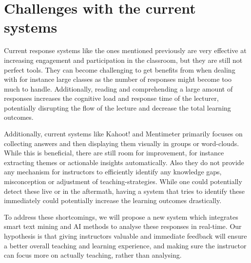 \section{Challenges with the current systems}


Current response systems like the ones mentioned previously are very effective at increasing engagement and participation in the classroom, but they are still not perfect tools. They can become challenging to get benefits from when dealing with for instance large classes as the number of responses might become too much to handle. Additionally, reading and comprehending a large amount of responses increases the cognitive load and response time of the lecturer, potentially disrupting the flow of the lecture and decrease the total learning outcomes. 

Additionally, current systems like Kahoot! and Mentimeter primarily focuses on collecting answers and then displaying them visually in groups or word-clouds. While this is beneficial, there are still room for improvement, for instance extracting themes or actionable insights automatically. Also they do not provide any mechanism for instructors to efficiently identify any knowledge gaps, misconception or adjustment of teaching-strategies. While one could potentially detect these live or in the aftermath, having a system that tries to identify these immediately could potentially increase the learning outcomes drastically. 

To address these shortcomings, we will propose a new system which integrates smart text mining and AI methods to analyse these responses in real-time. Our hypothesis is that giving instructors valuable and immediate feedback will ensure a better overall teaching and learning experience, and making sure the instructor can focus more on actually teaching, rather than analysing.


